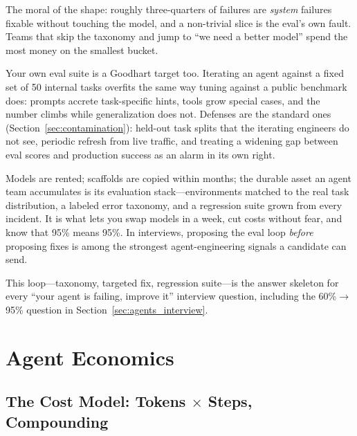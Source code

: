 The moral of the shape: roughly three-quarters of failures are \textit{system} failures fixable without touching the model, and a non-trivial slice is the eval's own fault. Teams that skip the taxonomy and jump to ``we need a better model'' spend the most money on the smallest bucket.

\begin{warningbox}
Your own eval suite is a Goodhart target too. Iterating an agent against a fixed set of 50 internal tasks overfits the same way tuning against a public benchmark does: prompts accrete task-specific hints, tools grow special cases, and the number climbs while generalization does not. Defenses are the standard ones (Section~\ref{sec:contamination}): held-out task splits that the iterating engineers do not see, periodic refresh from live traffic, and treating a widening gap between eval scores and production success as an alarm in its own right.
\end{warningbox}

\begin{keyinsight}
Models are rented; scaffolds are copied within months; the durable asset an agent team accumulates is its evaluation stack---environments matched to the real task distribution, a labeled error taxonomy, and a regression suite grown from every incident. It is what lets you swap models in a week, cut costs without fear, and know that 95\% means 95\%. In interviews, proposing the eval loop \textit{before} proposing fixes is among the strongest agent-engineering signals a candidate can send.
\end{keyinsight}

This loop---taxonomy, targeted fix, regression suite---is the answer skeleton for every ``your agent is failing, improve it'' interview question, including the 60\%$\to$95\% question in Section~\ref{sec:agents_interview}.

\section{Agent Economics}
\label{sec:agent_economics}

\subsection{The Cost Model: Tokens $\times$ Steps, Compounding}

